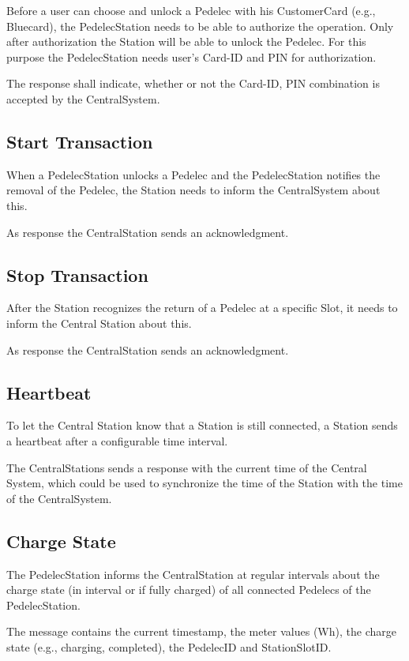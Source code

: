 Before a user can choose and unlock a Pedelec with his CustomerCard (e.g., Bluecard), the PedelecStation needs to be able to authorize the operation. Only after authorization the Station will be able to unlock the Pedelec. For this purpose the PedelecStation needs user's Card-ID and PIN for authorization.

The response shall indicate, whether or not the Card-ID, PIN combination is accepted by the CentralSystem.

\subsection{Start Transaction}

When a PedelecStation unlocks a Pedelec and the PedelecStation notifies the removal of the Pedelec, the Station needs to inform the CentralSystem about this.

As response the CentralStation sends an acknowledgment.

\subsection{Stop Transaction}

After the Station recognizes the return of a Pedelec at a specific Slot, it needs to inform the Central Station about this.

As response the CentralStation sends an acknowledgment.

\subsection{Heartbeat}

To let the Central Station know that a Station is still connected, a Station sends a heartbeat after a configurable time interval.

The CentralStations sends a response with the current time of the Central System, which could be used to synchronize the time of the Station with the time of the CentralSystem.

\subsection{Charge State}

The PedelecStation informs the CentralStation at regular intervals about the charge state (in interval or if fully charged) of all connected Pedelecs of the PedelecStation.

The message contains the current timestamp, the meter values (Wh), the charge state (e.g., charging, completed), the PedelecID and StationSlotID.